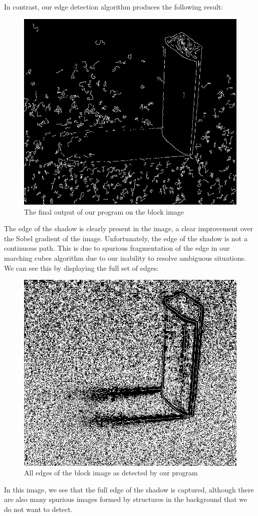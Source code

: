 \documentclass{article}
\begin{document}
In contrast, our edge detection algorithm produces the following result:
\begin{figure}[H]
  \centering
  \includegraphics[scale=0.36]{Images/block/block_final.png}
  \caption{The final output of our program on the block image}
  \label{block_final}
\end{figure}
The edge of the shadow is clearly present in the image, a clear improvement over the Sobel gradient of the image.
Unfortunately, the edge of the shadow is not a continuous path.
This is due to spurious fragmentation of the edge in our marching cubes algorithm due to our inability to resolve ambiguous situations.
We can see this by displaying the full set of edges:
\begin{figure}[H]
  \centering
  \includegraphics[scale=0.36]{Images/block/block_all_edges.png}
  \caption{All edges of the block image as detected by our program}
  \label{block_all_edges}
\end{figure}
In this image, we see that the full edge of the shadow is captured, although there are also many spurious images formed by structures in the background that we do not want to detect.
\end{document}
